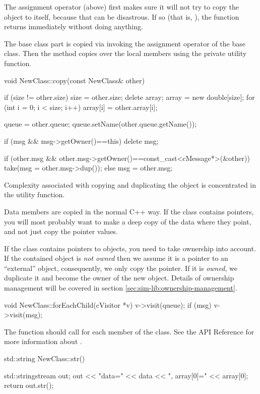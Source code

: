 The assignment operator (above) first makes sure it will not try to copy
the object to itself, because that can be disastrous. If so (that is,
), the function returns immediately without doing anything.

The base class part is copied via invoking the assignment operator of
the base class. Then the method copies over the local members using the
 private utility function.

\begin{cpp}
void NewClass::copy(const NewClass& other)
{
    if (size != other.size) {
        size = other.size;
        delete array;
        array = new double[size];
    }
    for (int i = 0; i < size; i++)
        array[i] = other.array[i];

    queue = other.queue;
    queue.setName(other.queue.getName());

    if (msg && msg->getOwner()==this)
        delete msg;

    if (other.msg && other.msg->getOwner()==const_cast<cMessage*>(&other))
        take(msg = other.msg->dup());
    else
        msg = other.msg;
}
\end{cpp}

Complexity associated with copying and duplicating the object
is concentrated in the  utility function.

Data members are copied in the normal C++ way. If the class
contains pointers, you will most probably want to make a deep copy of
the data where they point, and not just copy the pointer values.

If the class contains pointers to {\opp} objects, you need
to take ownership into account. If the contained object is \textit{not owned}
then we assume it is a pointer to an ``external'' object, consequently,
we only copy the pointer. If it is \textit{owned}, we duplicate
it and become the owner of the new object. Details of ownership
management will be covered in section \ref{sec:sim-lib:ownership-management}.


\begin{cpp}
void NewClass::forEachChild(cVisitor *v)
{
    v->visit(queue);
    if (msg)
        v->visit(msg);
}
\end{cpp}

The  function should call 
for each  member of the class. See the API Reference for more
information about .

\begin{cpp}
std::string NewClass::str()
{
    std::stringstream out;
    out << "data=" << data << ", array[0]=" << array[0];
    return out.str();

}
\end{cpp}

